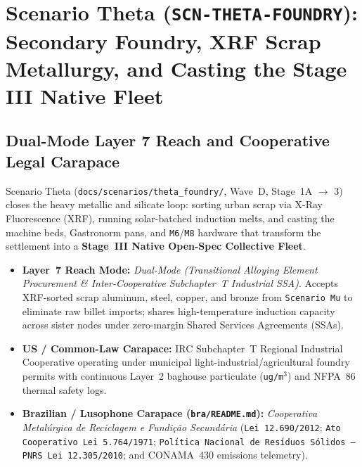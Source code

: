 \chapter{Scenario Theta (\texttt{SCN-THETA-FOUNDRY}): Secondary Foundry, XRF Scrap Metallurgy, and Casting the Stage III Native Fleet}
\label{app:scenario-theta}

\section{Dual-Mode Layer 7 Reach and Cooperative Legal Carapace}
Scenario Theta (\texttt{docs/scenarios/theta\_foundry/}, Wave~D, Stage~1A $\to$ 3) closes the heavy metallic and silicate loop: sorting urban scrap via X-Ray Fluorescence (XRF), running solar-batched induction melts, and casting the machine beds, Gastronorm pans, and \texttt{M6}/\texttt{M8} hardware that transform the settlement into a \textbf{Stage~III Native Open-Spec Collective Fleet}.
\begin{itemize}
    \item \textbf{Layer~7 Reach Mode:} \textit{Dual-Mode (Transitional Alloying Element Procurement \& Inter-Cooperative Subchapter~T Industrial SSA)}. Accepts XRF-sorted scrap aluminum, steel, copper, and bronze from \texttt{Scenario Mu} to eliminate raw billet imports; shares high-temperature induction capacity across sister nodes under zero-margin Shared Services Agreements (SSAs).
    \item \textbf{US / Common-Law Carapace:} IRC Subchapter~T Regional Industrial Cooperative operating under municipal light-industrial/agricultural foundry permits with continuous Layer~2 baghouse particulate (\texttt{ug/m}$^3$) and NFPA~86 thermal safety logs.
    \item \textbf{Brazilian / Lusophone Carapace (\texttt{bra/README.md}):} \textit{Cooperativa Metal{\'u}rgica de Reciclagem e Fundi{\c{c}}{\~a}o Secund{\'a}ria} (\texttt{Lei 12.690/2012}; \texttt{Ato Cooperativo Lei 5.764/1971}; \texttt{Pol{\'\i}tica Nacional de Res{\'\i}duos S{\'o}lidos --- PNRS Lei 12.305/2010}; and CONAMA~430 emissions telemetry).
\end{itemize}

